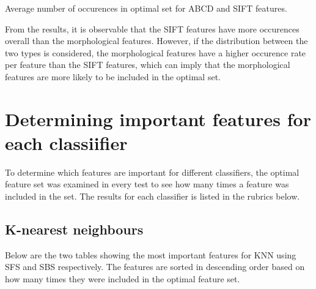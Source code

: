 \documentclass{kththesis}
\begin{document}
\begin{table}[h!]
  \caption{Average number of occurences in optimal set for ABCD and SIFT features.}
\end{table}

From the results, it is observable that the SIFT features have more occurences overall than the morphological features. However, if the distribution between the two types is considered, the morphological features have a higher occurence rate per feature than the SIFT features, which can imply that the morphological features are more likely to be included in the optimal set.

\section{Determining important features for each classiifier}

To determine which features are important for different classifiers, the optimal feature set was examined in every test to see how many times a feature was included in the set. The results for each classifier is listed in the rubrics below.

\subsection{K-nearest neighbours}

Below are the two tables showing the most important features for KNN using SFS and SBS respectively. The features are sorted in descending order based on how many times they were included in the optimal feature set.
\end{document}

